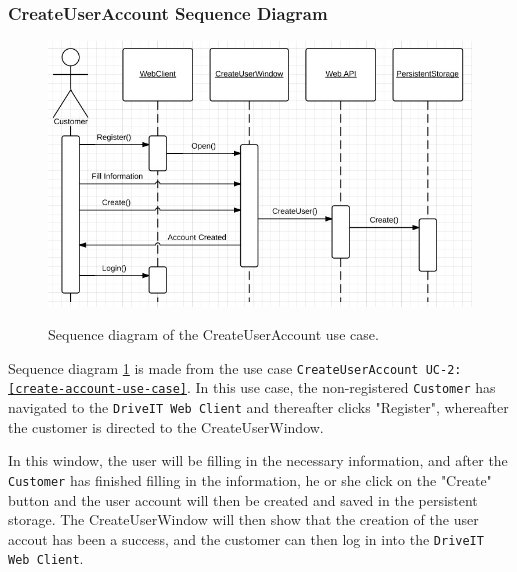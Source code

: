\subsubsection{CreateUserAccount Sequence Diagram}
\begin{figure}[H]
	\centering
		\includegraphics[width=\textwidth]{Figures/SequenceDiagram-CreateUserAccount}\\
	\caption{Sequence diagram of the CreateUserAccount use case.}
  \label{fig:SequenceDiagram-CreateUserAccount}
\end{figure}

Sequence diagram \ref{fig:SequenceDiagram-CreateUserAccount} is made from the use case \texttt{CreateUserAccount UC-2: \ref{create-account-use-case}}.
In this use case, the non-registered \texttt{Customer} has navigated to the \texttt{DriveIT Web Client} and thereafter clicks "Register", whereafter the customer is directed to the CreateUserWindow. 

In this window, the user will be filling in the necessary information, and after the \texttt{Customer} has finished filling in the information, he or she click on the "Create" button and the user account will then be created and saved in the persistent storage. The CreateUserWindow will then show that the creation of the user accout has been a success, and the customer can then log in into the \texttt{DriveIT Web Client}.

